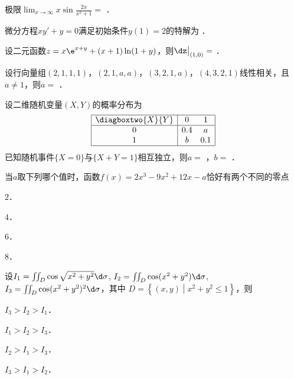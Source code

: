 \documentclass[plain,noanswer,medmath]{../../template/jnuexam}
\begin{document}






\begin{problem}
极限$\lim_{x \to \infty} x\sin \frac{2x}{x^2 + 1} =$ \fillin{}．
\end{problem}


\begin{problem}
微分方程$xy' + y = 0$满足初始条件$y(1) = 2$的特解为 \fillin{}．
\end{problem}


\begin{problem}
设二元函数$z = x\e^{x + y} + (x + 1)\ln(1 + y)$，则$\dz\big|_{(1,0)} =$ \fillin{}．
\end{problem}


\begin{problem}
设行向量组$(2,1,1,1)$，$(2,1,a,a)$，$(3,2,1,a)$，$(4,3,2,1)$线性相关，且$a \ne 1$，则$a =$ \fillin{}．
\end{problem}




\begin{problem}
设二维随机变量$(X,Y)$的概率分布为
$$\begin{array}{|c|cc|}
\hline
  \diagboxtwo{X}{Y} &   0 & 1 \\
\hline
                  0 & 0.4 & a \\
                  1 &   b & 0.1 \\
\hline
\end{array}$$
已知随机事件$\{X = 0\}$与$\{X + Y = 1\}$相互独立，则$a=$ \fillin{}，$b=$ \fillin{}．
\end{problem}




\begin{problem}
当$a$取下列哪个值时，函数$f(x) = 2x^3 - 9x^2 + 12x - a$恰好有两个不同的零点\pickout{}
\begin{abcd}
\item $2$．
\item $4$．
\item $6$．
\item $8$．
\end{abcd}
\end{problem}


\begin{problem}
设$I_1 = \iint_D \cos \sqrt{x^2 + y^2} \d\sigma$, $I_2 = \iint_D \cos(x^2 + y^2)\d\sigma$,
$I_3 = \iint_D \cos(x^2 + y^2)^2 \d\sigma$，其中
$D = \left\{(x,y) \middle| x^2 + y^2 \le 1 \right\}$，则\pickout{}
\begin{abcd}
\item $I_3 > I_2 > I_1$．
\item $I_1 > I_2 > I_3$．
\item $I_2 > I_1 > I_3$．
\item $I_3 > I_1 > I_2$．
\end{abcd}
\end{problem}
\end{document}
